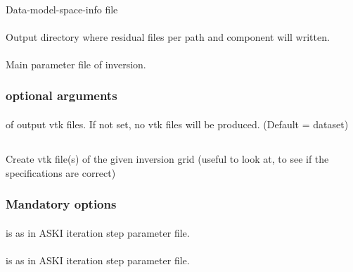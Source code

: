 \paragraph{}
Data-model-space-info file
\paragraph{}
Output directory where residual files per path and component will written.
\paragraph{}
Main parameter file of inversion.
\subsubsection{optional arguments}
\paragraph{}
 of output vtk files. If not set, no vtk files will be produced. (Default = dataset)
%
%
\subsection{} \label{programs_scripts,sec:bin_prog,sec:invgrid_vtk}
Create vtk file(s) of the given inversion grid (useful to look at, to see if the specifications are correct)

\subsubsection{Mandatory options}
\paragraph{}
 is  as in ASKI iteration step parameter file.
\paragraph{}
 is  as in ASKI iteration step parameter file.
